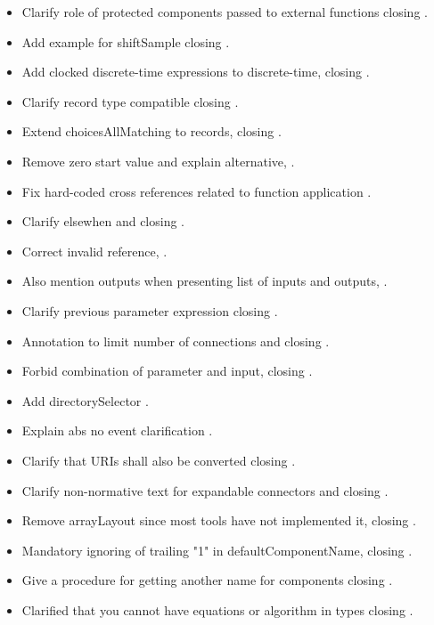 \begin{itemize}
\item Clarify role of protected components passed to external functions  closing .
\item Add example for shiftSample  closing .
\item Add clocked discrete-time expressions to discrete-time,  closing .
\item Clarify record type compatible  closing .
\item Extend choicesAllMatching to records,  closing .
\item Remove zero start value and explain alternative, .
\item Fix hard-coded cross references related to function application .
\item Clarify elsewhen  and  closing .
\item Correct invalid reference, .
\item Also mention outputs when presenting list of inputs and outputs, .
\item Clarify previous parameter expression  closing .
\item Annotation to limit number of connections  and  closing .
\item Forbid combination of parameter and input,  closing .
\item Add directorySelector .
\item Explain abs no event  clarification .
\item Clarify that URIs shall also be converted  closing .
\item Clarify non-normative text for expandable connectors  and  closing .
\item Remove arrayLayout since most tools have not implemented it,  closing .
\item Mandatory ignoring of trailing "1" in defaultComponentName,  closing .
\item Give a procedure for getting another name for components  closing .
\item Clarified that you cannot have equations or algorithm in types  closing .

\end{itemize}
